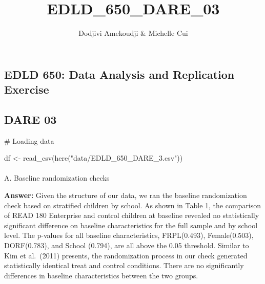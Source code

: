 \documentclass[
  letterpaper,
  DIV=11,
  numbers=noendperiod]{scrartcl}
\title{EDLD\_650\_DARE\_03}
\author{Dodjivi Amekoudji \& Michelle Cui}
\date{}
\makeatletter
\let\oldparagraph\paragraph
\renewcommand{\paragraph}{
    \@ifstar
      \xxxParagraphStar
      \xxxParagraphNoStar
  }
\newcommand{\xxxParagraphStar}[1]{\oldparagraph*{#1}\mbox{}}
\newcommand{\xxxParagraphNoStar}[1]{\oldparagraph{#1}\mbox{}}
\newenvironment{Shaded}{\begin{snugshade}}{\end{snugshade}}
\newcommand{\CommentTok}[1]{\textcolor[rgb]{0.37,0.37,0.37}{#1}}
\newcommand{\FunctionTok}[1]{\textcolor[rgb]{0.28,0.35,0.67}{#1}}
\newcommand{\NormalTok}[1]{\textcolor[rgb]{0.00,0.23,0.31}{#1}}
\newcommand{\OtherTok}[1]{\textcolor[rgb]{0.00,0.23,0.31}{#1}}
\newcommand{\StringTok}[1]{\textcolor[rgb]{0.13,0.47,0.30}{#1}}
\makeatother
\begin{document}
\maketitle


\subsection{EDLD 650: Data Analysis and Replication
Exercise}\label{edld-650-data-analysis-and-replication-exercise}

\subsection{DARE 03}\label{dare-03}

\begin{Shaded}
\begin{Highlighting}[]
\CommentTok{\# Loading data}

\NormalTok{df }\OtherTok{\textless{}{-}} \FunctionTok{read\_csv}\NormalTok{(}\FunctionTok{here}\NormalTok{(}\StringTok{"data/EDLD\_650\_DARE\_3.csv"}\NormalTok{))}
\end{Highlighting}
\end{Shaded}

\paragraph{A. Baseline randomization
checks}\label{a.-baseline-randomization-checks}

\textbf{Answer:} Given the structure of our data, we ran the baseline
randomization check based on stratified children by school. As shown in
Table 1, the comparison of READ 180 Enterprise and control children at
baseline revealed no statistically significant difference on baseline
characteristics for the full sample and by school level. The p-values
for all baseline characteristics, FRPL(0.493), Female(0.503),
DORF(0.783), and School (0.794), are all above the 0.05 threshold.
Similar to Kim et al.~(2011) presents, the randomization process in our
check generated statistically identical treat and control conditions.
There are no significantly differences in baseline characteristics
between the two groups.
\end{document}

